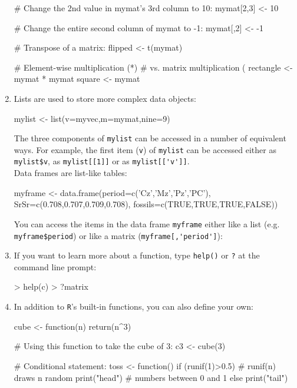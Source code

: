 \begin{enumerate}
\begin{script}
# Change the 2nd value in mymat's 3rd column to 10:
mymat[2,3] <- 10

# Change the entire second column of mymat to -1:
mymat[,2] <- -1

# Transpose of a matrix:
flipped <- t(mymat)

# Element-wise multiplication (*) 
# vs. matrix multiplication (%
rectangle <- mymat * mymat
square <- mymat %
\end{script}

\item Lists are used to store more complex data objects:

\begin{script}
mylist <- list(v=myvec,m=mymat,nine=9)
\end{script}

The three components of \texttt{mylist} can be accessed in a number of
equivalent ways. For example, the first item (\texttt{v}) of
\texttt{mylist} can be accessed either as \verb|mylist$v|, as
\verb|mylist[[1]]| or as \verb|mylist[['v']]|.\\

Data frames are list-like tables:

\begin{script}
myframe <- data.frame(period=c('Cz','Mz','Pz','PC'),
                      SrSr=c(0.708,0.707,0.709,0.708),
                      fossils=c(TRUE,TRUE,TRUE,FALSE))
\end{script}

You can access the items in the data frame \texttt{myframe} either
like a list (e.g. \verb|myframe$period|) or like a matrix
(\verb|myframe[,'period']|):

\item If you want to learn more about a function, type \texttt{help()} or
\texttt{?} at the command line prompt:

\begin{console}
> help(c)
> ?matrix
\end{console}

\item In addition to \texttt{R}'s built-in functions, you can also define
  your own:

\begin{script}
cube <- function(n){
    return(n^3)
}

# Using this function to take the cube of 3:
c3 <- cube(3)

# Conditional statement:
toss <- function(){
    if (runif(1)>0.5){ # runif(n) draws n random 
        print("head")  # numbers between 0 and 1
    } else {
        print("tail")
    }
}


\end{script}
\end{enumerate}
